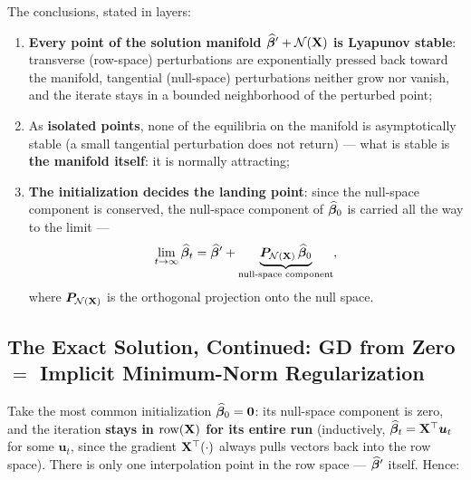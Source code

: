 The conclusions, stated in layers:
\begin{enumerate}[label=(\arabic*)]
  \item \textbf{Every point of the solution manifold $\widehat{\bm{\beta}}' + \mathcal{N}(\mathbf{X})$ is Lyapunov stable}: transverse (row-space) perturbations are exponentially pressed back toward the manifold, tangential (null-space) perturbations neither grow nor vanish, and the iterate stays in a bounded neighborhood of the perturbed point;
  \item As \textbf{isolated points}, none of the equilibria on the manifold is asymptotically stable (a small tangential perturbation does not return) — what is stable is \textbf{the manifold itself}: it is normally attracting;
  \item \textbf{The initialization decides the landing point}: since the null-space component is conserved, the null-space component of $\widehat{\bm{\beta}}_0$ is carried all the way to the limit —
  \[
    \lim_{t \to \infty} \widehat{\bm{\beta}}_t = \widehat{\bm{\beta}}' + \underbrace{\bm{P}_{\mathcal{N}(\mathbf{X})}\, \widehat{\bm{\beta}}_0}_{\text{null-space component}} ,
  \]
  where $\bm{P}_{\mathcal{N}(\mathbf{X})}$ is the orthogonal projection onto the null space.
\end{enumerate}

\subsection{The Exact Solution, Continued: GD from Zero $=$ Implicit Minimum-Norm Regularization}\label{sec:implicit}

Take the most common initialization $\widehat{\bm{\beta}}_0 = \mathbf{0}$: its null-space component is zero, and the iteration \textbf{stays in $\mathrm{row}(\mathbf{X})$ for its entire run} (inductively, $\widehat{\bm{\beta}}_t = \mathbf{X}^\top \bm{u}_t$ for some $\bm{u}_t$, since the gradient $\mathbf{X}^\top(\cdot)$ always pulls vectors back into the row space). There is only one interpolation point in the row space — $\widehat{\bm{\beta}}'$ itself. Hence:

